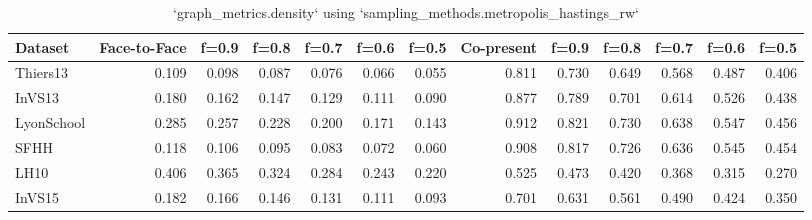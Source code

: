 \begin{table}[ht]
\begin{tabular}{lrrrrrrrrrrrr}
\hline
 Dataset    &   Face-to-Face &   f=0.9 &   f=0.8 &   f=0.7 &   f=0.6 &   f=0.5 &   Co-present &   f=0.9 &   f=0.8 &   f=0.7 &   f=0.6 &   f=0.5 \\
\hline
 Thiers13   &          0.109 &   0.098 &   0.087 &   0.076 &   0.066 &   0.055 &        0.811 &   0.730 &   0.649 &   0.568 &   0.487 &   0.406 \\
 InVS13     &          0.180 &   0.162 &   0.147 &   0.129 &   0.111 &   0.090 &        0.877 &   0.789 &   0.701 &   0.614 &   0.526 &   0.438 \\
 LyonSchool &          0.285 &   0.257 &   0.228 &   0.200 &   0.171 &   0.143 &        0.912 &   0.821 &   0.730 &   0.638 &   0.547 &   0.456 \\
 SFHH       &          0.118 &   0.106 &   0.095 &   0.083 &   0.072 &   0.060 &        0.908 &   0.817 &   0.726 &   0.636 &   0.545 &   0.454 \\
 LH10       &          0.406 &   0.365 &   0.324 &   0.284 &   0.243 &   0.220 &        0.525 &   0.473 &   0.420 &   0.368 &   0.315 &   0.270 \\
 InVS15     &          0.182 &   0.166 &   0.146 &   0.131 &   0.111 &   0.093 &        0.701 &   0.631 &   0.561 &   0.490 &   0.424 &   0.350 \\
\hline
\end{tabular}
\caption{`graph_metrics.density` using `sampling_methods.metropolis_hastings_rw`}
\end{table}